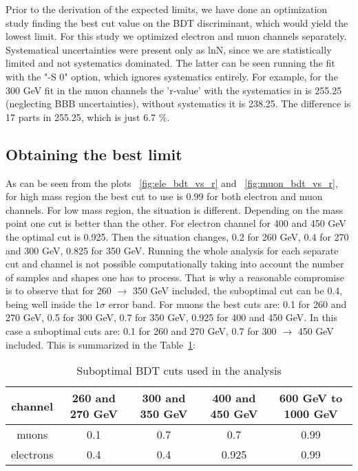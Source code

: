 
Prior to the derivation of the expected limits, we have done an optimization study finding the best cut value on the BDT discriminant, which would yield the lowest limit. For this study we optimized electron and muon channels separately. Systematical uncertainties were present only as lnN, since we are statistically limited and not systematics dominated. The latter can be seen running the fit with the "-S 0" option, which ignores systematics entirely. For example, for the 300 GeV fit in the muon channels the 'r-value' with the systematics in is 255.25 (neglecting BBB uncertainties), without systematics it is 238.25. The difference is 17 parts in 255.25, which is just 6.7 $\%$.

\subsection{Obtaining the best limit}

As can be seen from the plots ~\ref{fig:ele_bdt_vs_r} and ~\ref{fig:muon_bdt_vs_r}, for high mass region the best cut to use is 0.99 for both electron and muon channels. For low mass region, the situation is different. Depending on the mass point one cut is better than the other. For electron channel for 400 and 450 GeV the optimal cut is 0.925. Then the situation changes, 0.2 for 260 GeV, 0.4 for 270 and 300 GeV, 0.825 for 350 GeV. Running the whole analysis for each separate cut and channel is not possible computationally taking into account the number of samples and shapes one has to process. That is why a reasonable compromise is to observe that for 260 $\to$ 350 GeV included, the suboptimal cut can be 0.4, being well inside the $1\sigma$ error band. For muons the best cuts are: 0.1 for 260 and 270 GeV, 0.5 for 300 GeV, 0.7 for 350 GeV, 0.925 for 400 and 450 GeV. In this case a suboptimal cuts are: 0.1 for 260 and 270 GeV, 0.7 for 300 $\to$ 450 GeV included. This is summarized in the Table~\ref{suboptCut}:

\begin{table}
\begin{center} 
  \caption{Suboptimal BDT cuts used in the analysis}
 \begin{tabular}{ |c|c|c|c|c| } \hline%
   channel & 260 and 270 GeV & 300 and 350 GeV & 400 and 450 GeV & 600 GeV to 1000 GeV \\ \hline
   muons & 0.1 & 0.7 & 0.7 & 0.99 \\ %
   electrons & 0.4 & 0.4 & 0.925 & 0.99\\ \hline%
  \end{tabular}
  \label{suboptCut}
\end{center}   
\end{table}


